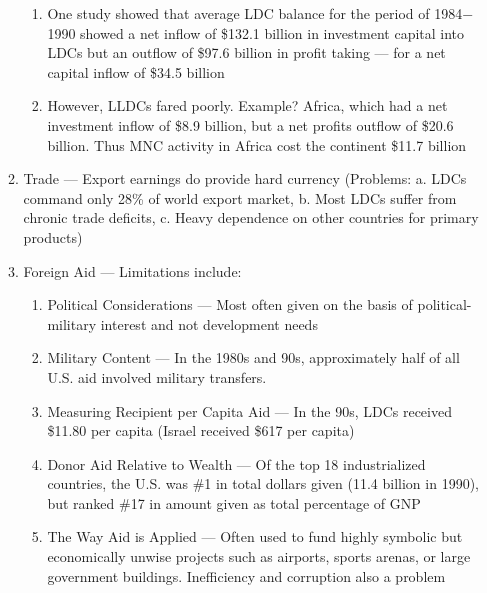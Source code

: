 \documentclass[12pt]{article}
\begin{document}
\begin{enumerate}
\begin{enumerate}
\begin{enumerate}
              \item One study showed that average LDC balance for the period of 1984$-$1990 showed a net inflow of \$132.1 billion in investment capital into LDCs but an outflow of \$97.6 billion in profit taking — for a net capital inflow of \$34.5 billion

              \item However, LLDCs fared poorly. Example? Africa, which had a net investment inflow of \$8.9 billion, but a net profits outflow of \$20.6 billion. Thus MNC activity in Africa cost the continent \$11.7 billion

            \end{enumerate}

          \item Trade — Export earnings do provide hard currency (Problems: a. LDCs command only 28\% of world export market, b. Most LDCs suffer from chronic trade deficits, c. Heavy dependence on other countries for primary products)

          \item Foreign Aid — Limitations include:

            \begin{enumerate}

              \item Political Considerations — Most often given on the basis of political-military interest and not development needs

              \item Military Content — In the 1980s and 90s, approximately half of all U.S. aid involved military transfers.

              \item Measuring Recipient per Capita Aid — In the 90s, LDCs received \$11.80 per capita (Israel received \$617 per capita) 

              \item Donor Aid Relative to Wealth — Of the top 18 industrialized countries, the U.S. was \#1 in total dollars given (11.4 billion in 1990), but ranked \#17 in amount given as total percentage of GNP

              \item The Way Aid is Applied — Often used to fund highly symbolic but economically unwise projects such as airports, sports arenas, or large government buildings. Inefficiency and corruption also a problem
                
            \end{enumerate}


\end{enumerate}
\end{enumerate}
\end{document}
